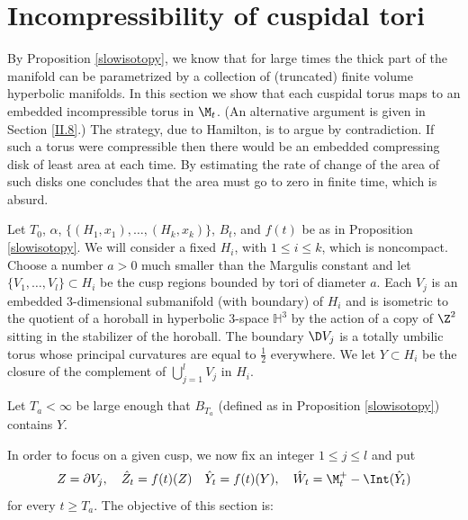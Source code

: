 \section{Incompressibility of cuspidal tori} \label{inctori}

By Proposition \ref{slowisotopy}, we know that for large times the thick
part of the manifold can
be parametrized by a collection of (truncated) finite volume hyperbolic
manifolds.  In this section we show that each cuspidal torus
maps to an embedded incompressible torus in $\M_t$.
(An alternative argument is given in Section \ref{II.8}.)
The strategy, due
to Hamilton, is to argue by contradiction. If such a torus were compressible
then there would be an embedded compressing disk of least area at each
time. By estimating the rate of change of the area of such disks one concludes
that the area must go to zero in finite time, which is absurd.

Let $T_0$, $\alpha$, $\{(H_1,x_1),\ldots,(H_k,x_k)\}$, $B_t$, and $f(t)$ be as
in Proposition \ref{slowisotopy}.  We will consider a fixed $H_i$, with $1\leq i\leq k$,  which
is noncompact.   Choose a  number
$a>0$ much smaller than the Margulis constant and let
$\{V_1,\ldots,V_l\}\subset H_i$
be  the cusp regions bounded by tori of diameter $a$.  Each
$V_j$ is an embedded $3$-dimensional submanifold (with boundary) of $H_i$
and is isometric to the quotient of a horoball in hyperbolic $3$-space $\mathbb{H}^3$
by the action of a copy of $\Z^2$ sitting in the stabilizer of the horoball.  The
boundary $\D V_j$ is a totally umbilic torus whose principal curvatures are
equal to $\frac12$ everywhere.   We let $Y\subset H_i$ be the closure of the complement
of $\bigcup_{j=1}^l V_j$ in $H_i$.

Let $T_a<\infty$ be large enough  that  $B_{T_a}$  (defined as in Proposition \ref{slowisotopy})
contains $Y$.

In order to focus on a given cusp, we now fix an integer $1\leq j \leq l$  and put
\begin{equation}
Z =  \partial V_{j},\quad\hat Z_t =  f(t)(Z)\\
\quad \hat Y_t =  f(t)(Y),\quad
\hat W_t =  \M_t^+ -  \Int(\hat Y_t)
\end{equation}
for every $t\geq T_a$.  The objective of this section is:

